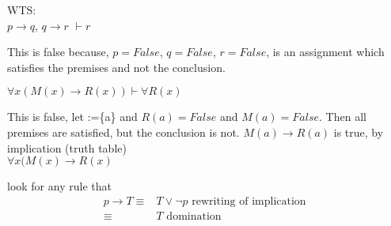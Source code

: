 \documentclass[letterpaper,12pt]{article}
\theoremstyle{plain}
\theoremstyle{definition}
\theoremstyle{remark}
\providecommand{\lor}{\ensuremath{\vee}}
\begin{document}
\newpage

WTS:\\
$p\to q$, $q\to r$ $\vdash r$ 

This is false because, $p=False$, $q=False$, $r=False$,
is an assignment which satisfies the premises and not the conclusion.

$\forall x(M(x)\to R(x)) \vdash \forall R(x)$ 

This is false, let :=\{a\} and 
$R(a)=False$ and $M(a)=False$.
Then all premises are satisfied, but the conclusion is not.
$M(a)\to R(a)$ is true, by implication (truth table)\\
$\forall x(M(x)\to R(x)$



\newpage

look for any rule that\\

\begin{align}
p \to T\equiv& T \lor \lnot p \text{   rewriting of implication }\\
 \equiv& T \text{   domination}
\end{align}
\end{document}
